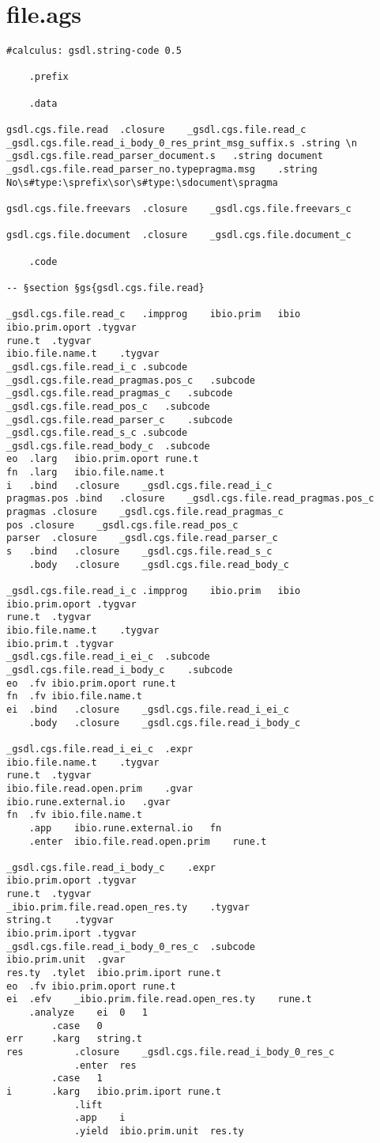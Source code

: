 \documentclass{report}
\begin{document}
\section{file.ags}

\begin{verbatim}
#calculus: gsdl.string-code 0.5

	.prefix

	.data

gsdl.cgs.file.read	.closure	_gsdl.cgs.file.read_c
_gsdl.cgs.file.read_i_body_0_res_print_msg_suffix.s	.string	\n
_gsdl.cgs.file.read_parser_document.s	.string	document
_gsdl.cgs.file.read_parser_no.typepragma.msg	.string	No\s#type:\sprefix\sor\s#type:\sdocument\spragma

gsdl.cgs.file.freevars	.closure	_gsdl.cgs.file.freevars_c

gsdl.cgs.file.document	.closure	_gsdl.cgs.file.document_c

	.code

-- §section §gs{gsdl.cgs.file.read}

_gsdl.cgs.file.read_c	.impprog	ibio.prim	ibio
ibio.prim.oport	.tygvar
rune.t	.tygvar
ibio.file.name.t	.tygvar
_gsdl.cgs.file.read_i_c	.subcode
_gsdl.cgs.file.read_pragmas.pos_c	.subcode
_gsdl.cgs.file.read_pragmas_c	.subcode
_gsdl.cgs.file.read_pos_c	.subcode
_gsdl.cgs.file.read_parser_c	.subcode
_gsdl.cgs.file.read_s_c	.subcode
_gsdl.cgs.file.read_body_c	.subcode
eo	.larg	ibio.prim.oport	rune.t
fn	.larg	ibio.file.name.t
i	.bind	.closure	_gsdl.cgs.file.read_i_c
pragmas.pos	.bind	.closure	_gsdl.cgs.file.read_pragmas.pos_c
pragmas	.closure	_gsdl.cgs.file.read_pragmas_c
pos	.closure	_gsdl.cgs.file.read_pos_c
parser	.closure	_gsdl.cgs.file.read_parser_c
s	.bind	.closure	_gsdl.cgs.file.read_s_c
	.body	.closure	_gsdl.cgs.file.read_body_c

_gsdl.cgs.file.read_i_c	.impprog	ibio.prim	ibio
ibio.prim.oport	.tygvar
rune.t	.tygvar
ibio.file.name.t	.tygvar
ibio.prim.t	.tygvar
_gsdl.cgs.file.read_i_ei_c	.subcode
_gsdl.cgs.file.read_i_body_c	.subcode
eo	.fv	ibio.prim.oport	rune.t
fn	.fv	ibio.file.name.t
ei	.bind	.closure	_gsdl.cgs.file.read_i_ei_c
	.body	.closure	_gsdl.cgs.file.read_i_body_c

_gsdl.cgs.file.read_i_ei_c	.expr
ibio.file.name.t	.tygvar
rune.t	.tygvar
ibio.file.read.open.prim	.gvar
ibio.rune.external.io	.gvar
fn	.fv	ibio.file.name.t
	.app	ibio.rune.external.io	fn
	.enter	ibio.file.read.open.prim	rune.t

_gsdl.cgs.file.read_i_body_c	.expr
ibio.prim.oport	.tygvar
rune.t	.tygvar
_ibio.prim.file.read.open_res.ty	.tygvar
string.t	.tygvar
ibio.prim.iport	.tygvar
_gsdl.cgs.file.read_i_body_0_res_c	.subcode
ibio.prim.unit	.gvar
res.ty	.tylet	ibio.prim.iport	rune.t
eo	.fv	ibio.prim.oport	rune.t
ei	.efv	_ibio.prim.file.read.open_res.ty	rune.t
	.analyze	ei	0	1
		.case	0
err		.karg	string.t
res			.closure	_gsdl.cgs.file.read_i_body_0_res_c
			.enter	res
		.case	1
i		.karg	ibio.prim.iport	rune.t
			.lift
			.app	i
			.yield	ibio.prim.unit	res.ty


\end{verbatim}
\end{document}
